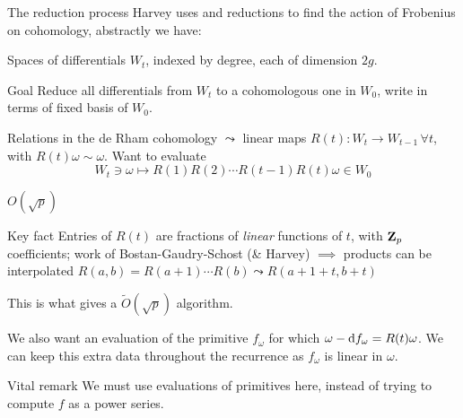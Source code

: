 \begin{frame}{The reduction process}
    Harvey uses  and  reductions to find the action of Frobenius on cohomology, \pause%
    abstractly we have:

    Spaces of differentials \(W_t\), indexed by degree, each of dimension \(2g\).
    \begin{block}{Goal} Reduce all differentials from \(W_t\) to a cohomologous one in \(W_0\), write in terms of fixed basis of \(W_0\).\end{block}
    \pause%
    Relations in the de Rham cohomology \(\leadsto\) linear maps \(R(t)\colon W_t \to W_{t-1}\,\forall t\), with \(R(t) \omega \sim \omega\).
    \pause%
    Want to evaluate
    \[W_t \ni \omega \mapsto R(1) R(2) \cdots R(t-1)R(t) \omega \in W_0\]

\end{frame}

\begin{frame}{\(O(\sqrt p)\)}
    \begin{alertblock}{Key fact}
        Entries of \(R(t)\) are fractions of \emph{linear} functions of \(t\), with \(\mathbf{Z}_p\) coefficients; work of Bostan-Gaudry-Schost (\& Harvey) $\implies$ products can be interpolated
        \(R(a,b) = R(a+1) \cdots R(b)\leadsto R(a+1+t,b+t)\)
    \end{alertblock}
    This is what gives a \(\widetilde O(\sqrt p)\) algorithm.

    \pause%
    We also want an evaluation of the primitive \(f_{\omega}\) for which \(\omega - \mathop{}\!\mathrm{d} f_{\omega} = R(t)\omega\).
    We can keep this extra data throughout the recurrence as \(f_{\omega}\) is linear in \(\omega\).

    \pause%
    \begin{block}{Vital remark}
        We must use evaluations of primitives here, instead of trying to compute \(f\) as a power series.
    \end{block}

\end{frame}

